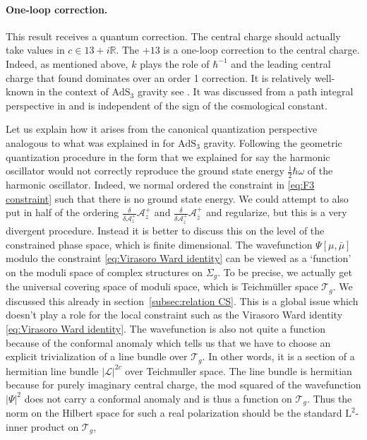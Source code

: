 \documentclass[12pt,a4paper]{article}
\newcommand\RR{\mathbb{R}}
\begin{document}
\paragraph{One-loop correction.} This result receives a quantum correction. The central charge should actually take values in $c \in 13+i \RR$. The $+13$ is a one-loop correction to the central charge. Indeed, as mentioned above, $k$ plays the role of $\hbar^{-1}$ and the leading central charge that found dominates over an order 1 correction. It is relatively well-known in the context of $\mathrm{AdS}_3$ gravity see \cite{Giombi:2008vd}. It was discussed from a path integral perspective in \cite{Cotler:2019nbi} and is independent of the sign of the cosmological constant.

Let us explain how it arises from the canonical quantization perspective analogous to what was explained in \cite{Eberhardt:2022wlc} for $\mathrm{AdS}_3$ gravity. Following the geometric quantization procedure in the form that we explained for say the harmonic oscillator would not correctly reproduce the ground state energy $\frac{1}{2}  \hbar \omega$ of the harmonic oscillator. Indeed, we normal ordered the constraint in \eqref{eq:F3 constraint} such that there is no ground state energy. We could attempt to also put in half of the ordering $\frac{\delta}{\delta \mathcal{A}_z^+} \mathcal{A}_z^+$ and $\frac{\delta}{\delta \mathcal{A}_{\bar{z}}^+} \mathcal{A}_{\bar{z}}^+$ and regularize, but this is a very divergent procedure.
Instead it is better to discuss this on the level of the constrained phase space, which is finite dimensional. The wavefunction $\Psi[\mu,\bar{\mu}]$ modulo the constraint \eqref{eq:Virasoro Ward identity} can be viewed as a `function' on the moduli space of complex structures on $\Sigma_g$. To be precise, we actually get the universal covering space of moduli space, which is Teichm\"uller space $\mathcal{T}_g$. We discussed this already in section~\ref{subsec:relation CS}. This is a global issue which doesn't play a role for the local constraint such as the Virasoro Ward identity \eqref{eq:Virasoro Ward identity}. The wavefunction is also not quite a function because of the conformal anomaly which tells us that we have to choose an explicit trivialization of a line bundle over $\mathcal{T}_g$. In other words, it is a section of a hermitian line bundle $|\mathscr{L}|^{2c}$ over Teichmuller space. The line bundle is hermitian because for purely imaginary central charge, the mod squared of the wavefunction $|\Psi|^2$ does not carry a conformal anomaly and is thus a function on $\mathcal{T}_g$. Thus the norm on the Hilbert space for such a real polarization should be the standard $\mathrm{L}^2$-inner product on $\mathcal{T}_g$,
\end{document}
